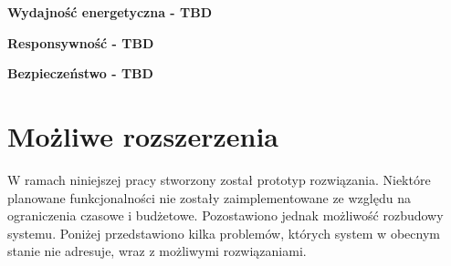 


	\textbf{Wydajność energetyczna - TBD}

	\textbf{Responsywność - TBD}

	\textbf{Bezpieczeństwo - TBD}

	\section{Możliwe rozszerzenia}

        W ramach niniejszej pracy stworzony został prototyp rozwiązania. Niektóre planowane funkcjonalności nie zostały zaimplementowane ze względu na ograniczenia czasowe i budżetowe. Pozostawiono jednak możliwość rozbudowy systemu. Poniżej przedstawiono kilka problemów, których system w obecnym stanie nie adresuje, wraz z możliwymi rozwiązaniami.

